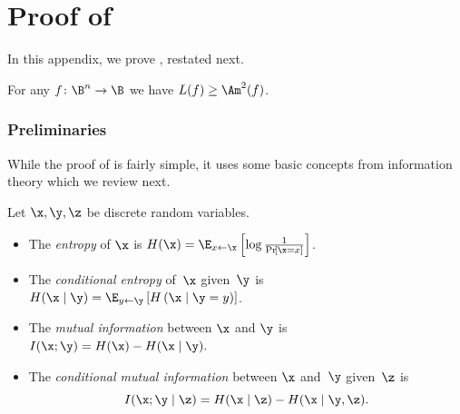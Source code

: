 \appendix

\section{\label{sec:L-Am}Proof of }

In this appendix, we prove , restated next. 
\begin{restated}{}
For any $f\colon\B^{n}\to\B$ we have $L(f)\geq\Am^{2}(f)$. 
\end{restated}


\subsubsection*{Preliminaries}

While the proof of  is fairly simple, it uses some basic
concepts from information theory which we review next. 
\begin{definition}
\label{def:information}Let $\x,\y,\z$ be discrete random variables. 
\begin{itemize}
\item The \emph{entropy} of $\x$ is $H(\x)=\E_{x\gets\x}\left[\log\frac{1}{\Pr\!\left[\x=x\right]}\right]$. 
\item The \emph{conditional entropy} of~$\x$ given~$\y$ is $H(\x\mid\y)=\E_{y\gets\y}\left[H\left(\x\mid\y=y\right)\right]$. 
\item The \emph{mutual information} between $\x$ and $\y$ is $I(\x;\y)=H(\x)-H(\x\mid\y).$ 
\item The \emph{conditional mutual information} between $\x$ and~$\y$
given~$\z$ is 
\[
I(\x;\y\mid\z)=H(\x\mid\z)-H(\x\mid\y,\z).
\]
\end{itemize}
\end{definition}

